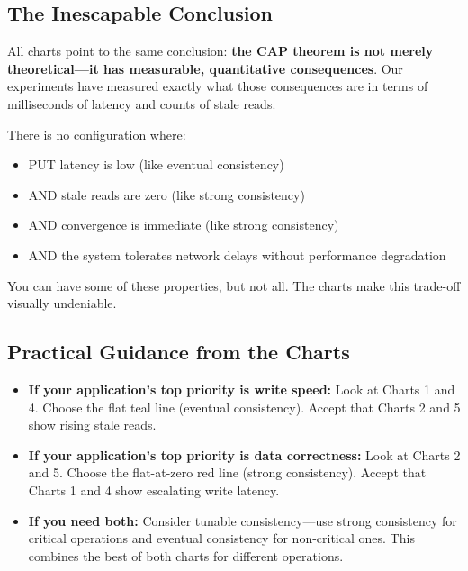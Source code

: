 \documentclass[10pt,a4paper]{article}
\begin{document}
\newpage

\subsection{The Inescapable Conclusion}

All charts point to the same conclusion: \textbf{the CAP theorem is not merely theoretical---it has measurable, quantitative consequences}. Our experiments have measured exactly what those consequences are in terms of milliseconds of latency and counts of stale reads.

There is no configuration where:
\begin{itemize}
    \item PUT latency is low (like eventual consistency)
    \item AND stale reads are zero (like strong consistency)
    \item AND convergence is immediate (like strong consistency)
    \item AND the system tolerates network delays without performance degradation
\end{itemize}

You can have some of these properties, but not all. The charts make this trade-off visually undeniable.

\subsection{Practical Guidance from the Charts}

\begin{itemize}
    \item \textbf{If your application's top priority is write speed:} Look at Charts 1 and 4. Choose the flat teal line (eventual consistency). Accept that Charts 2 and 5 show rising stale reads.
    
    \item \textbf{If your application's top priority is data correctness:} Look at Charts 2 and 5. Choose the flat-at-zero red line (strong consistency). Accept that Charts 1 and 4 show escalating write latency.
    
    \item \textbf{If you need both:} Consider tunable consistency---use strong consistency for critical operations and eventual consistency for non-critical ones. This combines the best of both charts for different operations.
\end{itemize}
\end{document}
